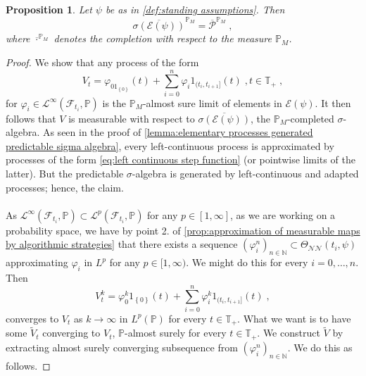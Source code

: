 \documentclass[11pt]{report}
\theoremstyle{plain} %
\newtheorem{proposition}[proposition]{Proposition}
\theoremstyle{definition} %
\theoremstyle{remark} %
\begin{document}
\begin{proposition}\label{prop:E(psi) generated P}
 Let \(\psi\) be as in \cref{def:standing assumptions}. Then 
    \begin{equation}
        \overline{\sigma(\mathcal{E}(\psi))}^{\mathbb{P}_M}=\overline{\mathcal{P}}^{\mathbb{P}_M}\;,
    \end{equation}
    where \(\overline{\cdot}^{\mathbb{P}_M}\) denotes the completion with respect to the measure \({\mathbb{P}_M}\).
\end{proposition}
\begin{proof}
    We show that any process of the form 
    \begin{equation}\label{eq:left continuous step function}
        V_t = \varphi_01_{\left\{ 0\right\}}(t)+\sum_{i=0}^n \varphi_i1_{(t_i,t_{i+1}]}(t)\;,t\in\mathbb{T}_+\;,
    \end{equation}
    for \(\varphi_i\in\mathcal{L}^{\infty}(\mathcal{F}_{t_i},\mathbb{P})\) 
    is the \(\mathbb{P}_M\)-almost sure limit of elements in \(\mathcal{E}(\psi)\). It then follows that \(V\) is measurable with respect to \(\overline{\sigma(\mathcal{E}(\psi))}\), the \(\mathbb{P}_M\)-completed \(\sigma\)-algebra. As seen in the proof of \cref{lemma:elementary processes generated predictable sigma algebra}, every left-continuous process is approximated by processes of the form \cref{eq:left continuous step function} (or pointwise limits of the latter). But the predictable \(\sigma\)-algebra is generated by left-continuous and adapted processes; hence, the claim.
    \\\\ 
    As \(\mathcal{L}^{\infty}(\mathcal{F}_{t_i},\mathbb{P})\subset \mathcal{L}^p(\mathcal{F}_{t_i},\mathbb{P})\) for any \(p\in[1,\infty]\), as we are working on a probability space, we have by point 2.  of \cref{prop:approximation of measurable maps by algorithmic strategies} that there exists a sequence \((\varphi_i^n)_{n\in\mathbb{N}}\subset\Theta_{\mathcal{NN}}(t_i,\psi)\) approximating \(\varphi_i\) in \(L^p\) for any \(p\in[1,\infty)\). 
    We might do this for every \(i=0,\dots, n\). Then 
    \begin{equation}
        V_t^k=\varphi_0^k1_{\left\{ 0\right\}}(t)+\sum_{i=0}^n \varphi_i^k1_{(t_i,t_{i+1}]}(t)\;,
    \end{equation}
    converges to \(V_t\) as \(k\to\infty\) in \(L^p(\mathbb{P})\) for every \(t\in\mathbb{T}_+\). What we want is to have some \(\widetilde{V}_t\) converging to \(V_t\), \(\mathbb{P}\)-almost surely for every \(t\in\mathbb{T}_+\). We construct \(\widetilde{V}\) by extracting almost surely converging subsequence from \((\varphi_i^n)_{n\in\mathbb{N}}\). We do this as follows.

\end{proof}
\end{document}
